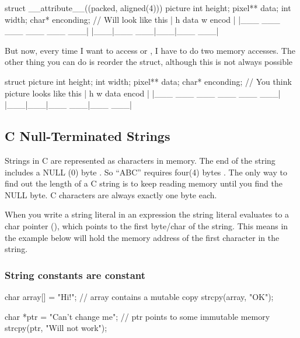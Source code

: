 \begin{code}[language=C]
struct __attribute__((packed, aligned(4))) picture{
    int height;
    pixel** data;
    int width;
    char* enconding;
}
// Will look like this
| h   data    w   encod |
|___ ___ ___ ___ ___ ___|
|___|___ ___|___|___ ___|

\end{code}

But now, every time I want to access  or ,
I have to do two memory accesses. The other thing you can do is reorder
the struct, although this is not always possible

\begin{code}[language=C]
struct picture{
    int height;
    int width;
    pixel** data;
    char* enconding;
}
// You think picture looks like this
| h   w    data   encod |
|___ ___ ___ ___ ___ ___|
|___|___|___ ___|___ ___|

\end{code}

\subsection{C Null-Terminated Strings}

Strings in C are represented as characters in memory. The end of the string includes a NULL (0) byte \cite{CITATION_NEEDED}. So ``ABC'' requires four(4) bytes .
The only way to find out the length of a C string is to keep reading memory until you find the NULL byte. C characters are always exactly one byte each.

When you write a string literal  in an expression the string literal evaluates to a char pointer (), which points to the first byte/char of the string. This means  in the example below will hold the memory address of the first character in the string.

\subsubsection{String constants are constant}

\begin{code}[language=C]
char array[] = "Hi!"; // array contains a mutable copy 
strcpy(array, "OK");

char *ptr = "Can't change me"; // ptr points to some immutable memory
strcpy(ptr, "Will not work");
\end{code}


